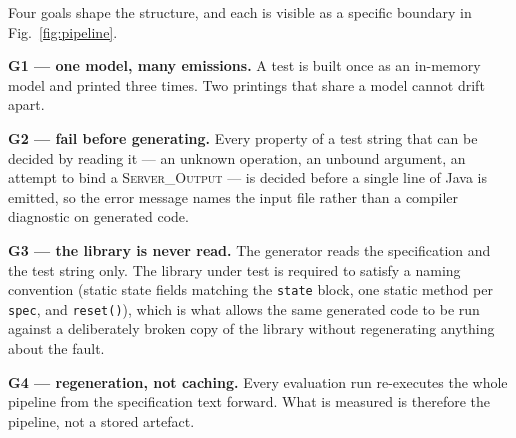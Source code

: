 \documentclass[conference]{IEEEtran}
\begin{document}
Four goals shape the structure, and each is visible as a specific boundary in
Fig.~\ref{fig:pipeline}.

\textbf{G1 --- one model, many emissions.} A test is built once as an in-memory
model and printed three times. Two printings that share a model cannot drift apart.

\textbf{G2 --- fail before generating.} Every property of a test string that can be
decided by reading it --- an unknown operation, an unbound argument, an attempt to
bind a \textsc{Server\_Output} --- is decided before a single line of Java is
emitted, so the error message names the input file rather than a compiler
diagnostic on generated code.

\textbf{G3 --- the library is never read.} The generator reads the specification and
the test string only. The library under test is required to satisfy a naming
convention (static state fields matching the \texttt{state} block, one static method
per \texttt{spec}, and \texttt{reset()}), which is what allows the same generated
code to be run against a deliberately broken copy of the library without
regenerating anything about the fault.

\textbf{G4 --- regeneration, not caching.} Every evaluation run re-executes the
whole pipeline from the specification text forward. What is measured is therefore
the pipeline, not a stored artefact.
\end{document}
